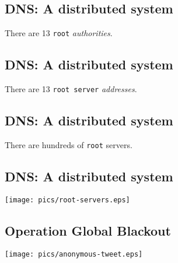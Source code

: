 \documentclass[xga]{xdvislides}
\begin{document}
\subsection{DNS: A distributed system}
\vspace{.5in}
\begin{center}
	\Huge
	There are 13 \verb+root+ {\em authorities}. \\
\end{center}
\Normalsize

\subsection{DNS: A distributed system}
\vspace{.5in}
\begin{center}
	\Huge
	There are 13 \verb+root server+ {\em addresses}. \\
\end{center}
\Normalsize

\subsection{DNS: A distributed system}
\vspace{.5in}
\begin{center}
	\Huge
	There are hundreds of \verb+root+ servers. \\
\end{center}
\Normalsize

\subsection{DNS: A distributed system}
\vspace*{\fill}
\begin{center}
	\texttt{[image: pics/root-servers.eps]}
\end{center}
\vspace*{\fill}

\subsection{Operation Global Blackout}
\vspace*{\fill}
\begin{center}
	\texttt{[image: pics/anonymous-tweet.eps]} \\
\end{center}
\vspace*{\fill}
\end{document}
